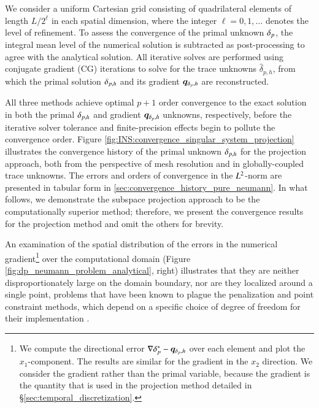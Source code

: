 We consider a uniform Cartesian grid consisting of quadrilateral elements of length $L/2^{\ell}$ in each spatial dimension, where the integer $\ell = 0, 1, \ldots$ denotes the level of refinement.
To assess the convergence of the primal unknown $\delta_{p}$, the integral mean level of the numerical solution is subtracted as post-processing to agree with the analytical solution.
All iterative solves are performed using conjugate gradient (CG) iterations to solve for the trace unknowns $\hat{\delta}_{p,h}$, from which the primal solution $\delta_{p,h}$ and its gradient $\bm{q}_{\delta_{p},h}$ are reconstructed.

All three methods achieve optimal $p+1$ order convergence to the exact solution in both the primal $\delta_{p,h}$ and gradient $\bm{q}_{\delta_{p},h}$ unknowns, respectively, before the iterative solver tolerance and finite-precision effects begin to pollute the convergence order. 
Figure \ref{fig:INS:convergence_singular_system_projection} illustrates the convergence history of the primal unknown $\delta_{p,h}$ for the projection approach, both from the perspective of mesh resolution and in globally-coupled trace unknowns.
The errors and orders of convergence in the $L^2$-norm are presented in tabular form in \ref{sec:convergence_history_pure_neumann}.
In what follows, we demonstrate the subspace projection approach to be the computationally superior method; therefore, we present the convergence results for the projection method and omit the others for brevity. 

An examination of the spatial distribution of the errors in the numerical gradient\footnote{%
We compute the directional error $\nabla \delta_p^* - \bm{q}_{\delta_{p},h}$ over each element and plot the $x_1$-component. The results are similar for the gradient in the $x_2$ direction. We consider the gradient rather than the primal variable, because the gradient is the quantity that is used in the projection method detailed in \S\ref{sec:temporal_discretization}.
}%
over the computational domain (Figure \ref{fig:dp_neumann_problem_analytical}, right) illustrates that they are neither disproportionately large on the domain boundary, nor are they localized around a single point, problems that have been known to plague the penalization and point constraint methods, which depend on a specific choice of degree of freedom for their implementation \cite{bochev_finite_2005,guermond_overview_2006}.

